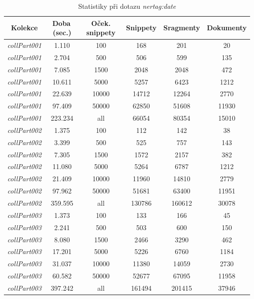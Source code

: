 \clearpage

\begin{table}[!ht]
\begin{tabular}{|c|c|c|c|c|c|}
\hline
\textbf{Kolekce} & \textbf{Doba\,(sec.)} & \textbf{Oček. snippety} & \textbf{Snippety} & \textbf{Sragmenty} & \textbf{Dokumenty} \\
\hline
\emph{collPart001} & 1.110 & 100 & 168 & 201 & 20 \\
\hline
\emph{collPart001} & 2.704 & 500 & 506 & 599 & 135\\
\hline
\emph{collPart001} & 7.085 & 1500 & 2048 & 2048 & 472 \\
\hline
\emph{collPart001} & 10.611 & 5000 & 5257 & 6423 & 1212 \\
\hline
\emph{collPart001} & 22.639 & 10000 & 14712 & 12264 & 2770 \\
\hline
\emph{collPart001} &  97.409 & 50000 & 62850 & 51608 & 11930 \\
\hline
\emph{collPart001} &  223.234 & all & 66054 & 80354 & 15010 \\
\hline\hline
\emph{collPart002} & 1.375 & 100 & 112 & 142 & 38 \\
\hline
\emph{collPart002} & 3.399 & 500 & 525 & 757 & 143 \\
\hline
\emph{collPart002} & 7.305 & 1500 & 1572 & 2157 & 382 \\
\hline
\emph{collPart002} & 11.080 & 5000 & 5264 & 6787 & 1212 \\
\hline
\emph{collPart002} & 21.409 & 10000 & 11960 & 14810 & 2779 \\
\hline
\emph{collPart002} & 97.962 & 50000 & 51681 & 63400 & 11951 \\
\hline
\emph{collPart002} & 359.595 & all & 130786 & 160612 & 30078\\
\hline\hline
\emph{collPart003} & 1.373 & 100 & 133 & 166 & 45 \\
\hline
\emph{collPart003} & 2.241 & 500 & 503 & 600 & 150 \\
\hline
\emph{collPart003} & 8.080 & 1500 & 2466 & 3290 & 462 \\
\hline
\emph{collPart003} & 17.201 & 5000 & 5226 & 6760 & 1184 \\
\hline
\emph{collPart003} & 31.037 & 10000 & 11380 & 14059 & 2730\\
\hline
\emph{collPart003} & 60.582 & 50000 & 52677 & 67095 & 11958\\
\hline
\emph{collPart003} & 397.242 & all & 161494 & 201415 & 37946\\
\hline
\end{tabular}

\caption{Statistiky při dotazu \emph{nertag:date}}
\label{nertagdateStats}
\end{table}

